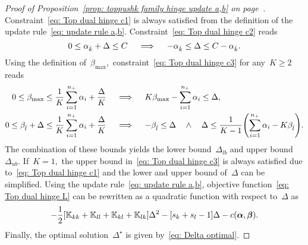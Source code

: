\topruleab*
\begin{proof}[Proof of Proposition~\ref{prop: toppushk family hinge update a,b} on page~\pageref{prop: toppushk family hinge update a,b}]
  Constraint~\eqref{eq: Top dual hinge c1} is always satisfied from the definition of the update rule~\eqref{eq: update rule a,b}. Constraint~\eqref{eq: Top dual hinge c2} reads
  \begin{equation*}
    0 \leq \alpha_{\hat{k}} + \Delta \leq C
    \quad \implies \quad
    - \alpha_{\hat{k}} \leq \Delta \leq C - \alpha_{\hat{k}}.
  \end{equation*}
  Using the definition of~$\beta_{\max},$ constraint~\eqref{eq: Top dual hinge c3} for any~$K \geq 2$ reads
  \begin{align*}
    0 \leq \beta_{\max} \leq \frac{1}{K} \sum_{i = 1}^{\npos} \alpha_i + \frac{\Delta}{K} 
    & \quad \implies \quad
    K\beta_{\max} - \sum_{i = 1}^{\npos} \alpha_i \leq \Delta, \\
    0 \leq \betal + \Delta \leq \frac{1}{K} \sum_{i = 1}^{\npos} \alpha_i + \frac{\Delta}{K}
    & \quad \implies \quad
    -\betal \leq \Delta \quad \land \quad \Delta \leq \frac{1}{K-1}\Brac{\sum_{i = 1}^{\npos} \alpha_i - K \betal}.
  \end{align*}
  The combination of these bounds yields the lower bound~$\Delta_{lb}$ and upper bound~$\Delta_{ub}.$ If~$K = 1,$ the upper bound in~\eqref{eq: Top dual hinge c3} is always satisfied due to~\eqref{eq: Top dual hinge c1} and the lower and upper bound of~$\Delta$ can be simplified. Using the update rule~\eqref{eq: update rule a,b}, objective function~\eqref{eq: Top dual hinge L} can be rewritten as a quadratic function with respect to~$\Delta$ as
  \begin{equation*}
    - \frac{1}{2} \Brac[s]{\K_{kk} + \K_{ll} + \K_{kl} + \K_{lk}} \Delta^2
    - \Brac[s]{s_k + s_l - 1} \Delta
    - c(\bm{\alpha}, \bm{\beta}).
  \end{equation*}
  Finally, the optimal solution~$\Delta^{\star}$ is given by~\eqref{eq: Delta optimal}.
\end{proof}

